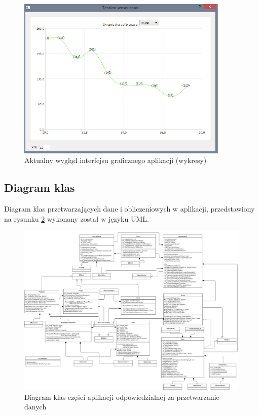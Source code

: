 \documentclass[10pt,a4paper]{article}
\begin{document}
\begin{figure}[!htb]
\centering
\includegraphics[width=0.9\textwidth]{./AktualnyInterfejsGraficznyChart.png}
\caption{Aktualny wygląd interfejsu graficznego aplikacji (wykresy)\label{fig:currentIntChart}}
\end{figure}

\newpage
\subsection{Diagram klas}
Diagram klas przetwarzających dane i obliczeniowych w aplikacji, przedstawiony na rysunku \ref{fig:classdiagram} wykonany został w języku UML.\\
\begin{figure}[!htb]
\centering
\includegraphics[angle=90,height=0.8\textheight]{./ClassDiagram.png}
\caption{Diagram klas części aplikacji odpowiedzialnej za przetwarzanie danych\label{fig:classdiagram}}
\end{figure}
\newpage
\end{document}
